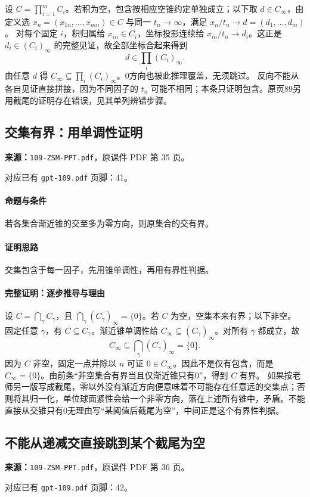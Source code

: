 设 $C=\prod_{i=1}^mC_i$。若积为空，包含按相应空锥约定单独成立；以下取 $d\in C_\infty$，由定义选 $x_n=(x_{1n},\ldots,x_{mn})\in C$ 与同一 $t_n\to\infty$，满足 $x_n/t_n\to d=(d_1,\ldots,d_m)$。
对每个固定 $i$，积归属给 $x_{in}\in C_i$，坐标投影连续给 $x_{in}/t_n\to d_i$。这正是 $d_i\in(C_i)_\infty$ 的完整见证，故全部坐标合起来得到
\[d\in\prod_i(C_i)_\infty.\]
由任意 $d$ 得 $C_\infty\subseteq\prod_i(C_i)_\infty$。0方向也被此推理覆盖，无须跳过。
反向不能从各自见证直接拼接，因为不同因子的 $t_n$ 可能不相同；本条只证明包含。原页89另用截尾的证明存在错误，见其单列辨错步骤。

\clearpage\subsection{交集有界：用单调性证明}
\textbf{来源：}\texttt{109-ZSM-PPT.pdf}，原课件 PDF 第 35 页。\par
对应已有 \texttt{gpt-109.pdf} 页脚：41。\par
\paragraph{命题与条件}若各集合渐近锥的交至多为零方向，则原集合的交有界。
\paragraph{证明思路}交集包含于每一因子，先用锥单调性，再用有界性判据。
\paragraph{完整证明：逐步推导与理由}

设 $C=\bigcap_\gamma C_\gamma$，且 $\bigcap_\gamma(C_\gamma)_\infty=\{0\}$。若 $C$ 为空，空集本来有界；以下非空。
固定任意 $\gamma$，有 $C\subseteq C_\gamma$。渐近锥单调性给 $C_\infty\subseteq(C_\gamma)_\infty$。对所有 $\gamma$ 都成立，故
\[C_\infty\subseteq\bigcap_\gamma(C_\gamma)_\infty=\{0\}.\]
因为 $C$ 非空，固定一点并除以 $n$ 可证 $0\in C_\infty$。因此不是仅有包含，而是 $C_\infty=\{0\}$。由前条“非空集合有界当且仅渐近锥只有0”，得到 $C$ 有界。
如果按老师另一版写成截尾，零以外没有渐近方向便意味着不可能存在任意远的交集点；否则将其归一化，单位球面紧性会给一个非零方向，落在上述所有锥中，矛盾。不能直接从交锥只有0无理由写“某阈值后截尾为空”，中间正是这个有界性判据。

\clearpage\subsection{不能从递减交直接跳到某个截尾为空}
\textbf{来源：}\texttt{109-ZSM-PPT.pdf}，原课件 PDF 第 36 页。\par
对应已有 \texttt{gpt-109.pdf} 页脚：42。\par
